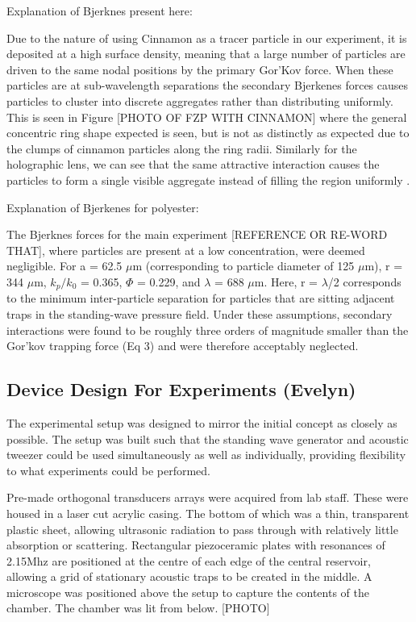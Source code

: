 \documentclass[11pt,a4paper]{article}
\begin{document}
Explanation of Bjerknes present here:

\noindent Due to the nature of using Cinnamon as a tracer particle in our experiment, it is deposited at a high surface density, meaning that a large number of particles are driven to the same nodal positions by the primary Gor'Kov force. When these particles are at sub-wavelength separations the secondary Bjerkenes forces causes particles to cluster into discrete aggregates rather than distributing uniformly. This is seen in Figure [PHOTO OF FZP WITH CINNAMON] where the general concentric ring shape expected is seen, but is not as distinctly as expected due to the clumps of cinnamon particles along the ring radii. Similarly for the holographic lens, we can see that the same attractive interaction causes the particles to form a single visible aggregate instead of filling the region uniformly \cite{inpetridish2025}\cite{silva2014}.

Explanation of Bjerkenes for polyester:

\noindent The Bjerknes forces for the main experiment [REFERENCE OR RE-WORD THAT], where particles are present at a low concentration, were deemed negligible. For a = 62.5 $\mu$m (corresponding to particle diameter of 125 $\mu$m), r = 344 $\mu$m, $k_p /k_0$ = 0.365, $\Phi$ = 0.229, and $\lambda$ = 688 $\mu$m. Here, r = $\lambda$/2 corresponds to the minimum inter-particle separation for particles that are sitting adjacent traps in the standing-wave pressure field. Under these assumptions, secondary interactions were found to be roughly three orders of magnitude smaller than the Gor’kov trapping force (Eq 3) and were therefore acceptably neglected.


\subsection{Device Design For Experiments (Evelyn)}

The experimental setup was designed to mirror the initial concept as closely as possible. The setup was built such that the standing wave generator and acoustic tweezer could be used simultaneously as well as individually, providing flexibility to what experiments could be performed.

Pre-made orthogonal transducers arrays were acquired from lab staff. These were housed in a laser cut acrylic casing. The bottom of which was a thin, transparent plastic sheet, allowing ultrasonic radiation to pass through with relatively little absorption or scattering. Rectangular piezoceramic plates with resonances of 2.15Mhz are positioned at the centre of each edge of the central reservoir, allowing a grid of stationary acoustic traps to be created in the middle.
A microscope was positioned above the setup to capture the contents of the chamber. The chamber was lit from below.
[PHOTO]
\end{document}

